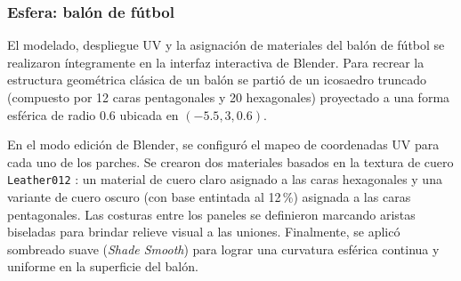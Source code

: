 \subsubsection{Esfera: balón de fútbol}
El modelado, despliegue UV y la asignación de materiales del balón de fútbol se realizaron íntegramente en la interfaz interactiva de Blender. Para recrear la estructura geométrica clásica de un balón se partió de un icosaedro truncado (compuesto por 12 caras pentagonales y 20 hexagonales) proyectado a una forma esférica de radio 0.6 ubicada en $(-5.5, 3, 0.6)$.

En el modo edición de Blender, se configuró el mapeo de coordenadas UV para cada uno de los parches. Se crearon dos materiales basados en la textura de cuero \texttt{Leather012} \cite{ambientcg}: un material de cuero claro asignado a las caras hexagonales y una variante de cuero oscuro (con base entintada al 12\,\%) asignada a las caras pentagonales. Las costuras entre los paneles se definieron marcando aristas biseladas para brindar relieve visual a las uniones. Finalmente, se aplicó sombreado suave (\textit{Shade Smooth}) para lograr una curvatura esférica continua y uniforme en la superficie del balón.
